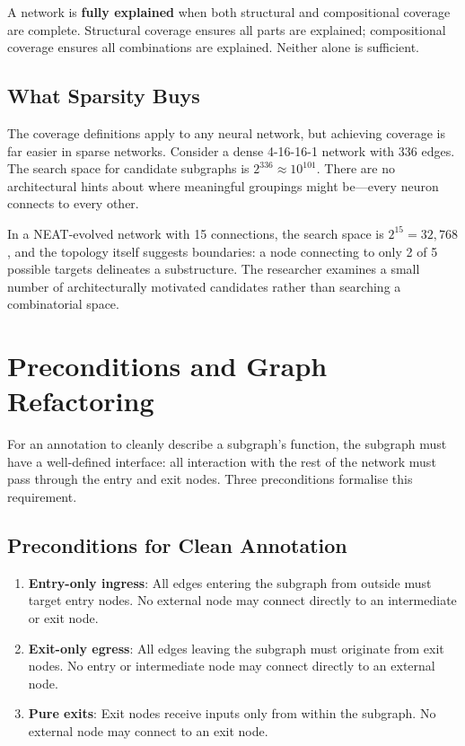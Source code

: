 \documentclass[11pt]{article}
\begin{document}
A network is \textbf{fully explained} when both structural and compositional coverage are complete. Structural coverage ensures all parts are explained; compositional coverage ensures all combinations are explained. Neither alone is sufficient.

\subsection{What Sparsity Buys}

The coverage definitions apply to any neural network, but achieving coverage is far easier in sparse networks. Consider a dense 4-16-16-1 network with 336 edges. The search space for candidate subgraphs is $2^{336} \approx 10^{101}$. There are no architectural hints about where meaningful groupings might be---every neuron connects to every other.

In a NEAT-evolved network with 15 connections, the search space is $2^{15} = 32{,}768$, and the topology itself suggests boundaries: a node connecting to only 2 of 5 possible targets delineates a substructure. The researcher examines a small number of architecturally motivated candidates rather than searching a combinatorial space.


\section{Preconditions and Graph Refactoring}
\label{sec:refactoring}

For an annotation to cleanly describe a subgraph's function, the subgraph must have a well-defined interface: all interaction with the rest of the network must pass through the entry and exit nodes. Three preconditions formalise this requirement.

\subsection{Preconditions for Clean Annotation}

\begin{enumerate}
    \item \textbf{Entry-only ingress}: All edges entering the subgraph from outside must target entry nodes. No external node may connect directly to an intermediate or exit node.
    \item \textbf{Exit-only egress}: All edges leaving the subgraph must originate from exit nodes. No entry or intermediate node may connect directly to an external node.
    \item \textbf{Pure exits}: Exit nodes receive inputs only from within the subgraph. No external node may connect to an exit node.
\end{enumerate}
\end{document}
